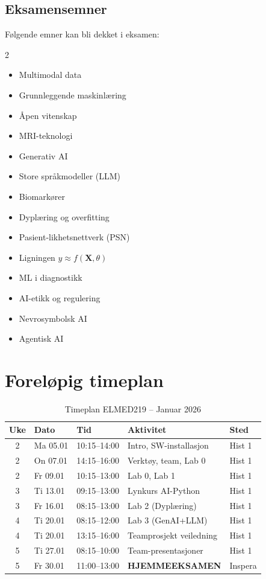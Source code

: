 \documentclass[11pt,a4paper]{article}
\begin{document}
\subsection{Eksamensemner}

Følgende emner kan bli dekket i eksamen:

\begin{multicols}{2}
\begin{itemize}[nosep]
    \item Multimodal data
    \item Grunnleggende maskinlæring
    \item Åpen vitenskap
    \item MRI-teknologi
    \item Generativ AI
    \item Store språkmodeller (LLM)
    \item Biomarkører
    \item Dyplæring og overfitting
    \item Pasient-likhetsnettverk (PSN)
    \item Ligningen $y \approx f(\mathbf{X}, \theta)$
    \item ML i diagnostikk
    \item AI-etikk og regulering
    \item Nevrosymbolsk AI
    \item Agentisk AI
\end{itemize}
\end{multicols}

\section{Foreløpig timeplan}

\begin{table}[htbp]
\centering
\caption{Timeplan ELMED219 -- Januar 2026}
\label{tab:timeplan}
\begin{tabular}{@{}cllll@{}}
\toprule
\textbf{Uke} & \textbf{Dato} & \textbf{Tid} & \textbf{Aktivitet} & \textbf{Sted} \\
\midrule
2 & Ma 05.01 & 10:15--14:00 & Intro, SW-installasjon & Hist 1 \\
2 & On 07.01 & 14:15--16:00 & Verktøy, team, Lab 0 & Hist 1 \\
2 & Fr 09.01 & 10:15--13:00 & Lab 0, Lab 1 & Hist 1 \\
3 & Ti 13.01 & 09:15--13:00 & Lynkurs AI-Python & Hist 1 \\
3 & Fr 16.01 & 08:15--13:00 & Lab 2 (Dyplæring) & Hist 1 \\
4 & Ti 20.01 & 08:15--12:00 & Lab 3 (GenAI+LLM) & Hist 1 \\
4 & Ti 20.01 & 13:15--16:00 & Teamprosjekt veiledning & Hist 1 \\
5 & Ti 27.01 & 08:15--10:00 & Team-presentasjoner & Hist 1 \\
5 & Fr 30.01 & 11:00--13:00 & \textbf{HJEMMEEKSAMEN} & Inspera \\
\bottomrule
\end{tabular}
\end{table}
\end{document}
